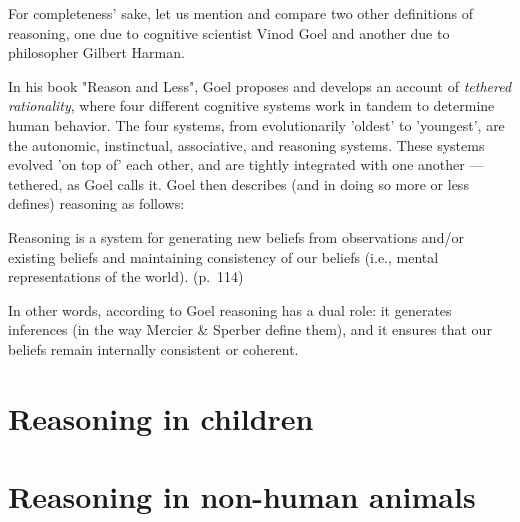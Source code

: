 For completeness' sake, let us mention and compare two other definitions of reasoning, one due to cognitive scientist Vinod Goel and another due to philosopher Gilbert Harman.

In his \citeyear{Goel22} book "Reason and Less", Goel proposes and develops an account of \emph{tethered rationality}, where four different cognitive systems work in tandem to determine human behavior. The four systems, from evolutionarily 'oldest' to 'youngest', are the autonomic, instinctual, associative, and reasoning systems. These systems evolved 'on top of' each other, and are tightly integrated with one another --- tethered, as Goel calls it.
Goel then describes (and in doing so more or less defines) reasoning as follows:
\begin{quoting}
    Reasoning is a system for generating new beliefs from observations and/or existing beliefs and maintaining consistency of our beliefs (i.e., mental representations of the world).
    \hfill (p.~114)
\end{quoting}
In other words, according to Goel reasoning has a dual role: it generates inferences (in the way Mercier \& Sperber define them), and it ensures that our beliefs remain internally consistent or coherent.

\section{Reasoning in children}


\section{Reasoning in non-human animals}


